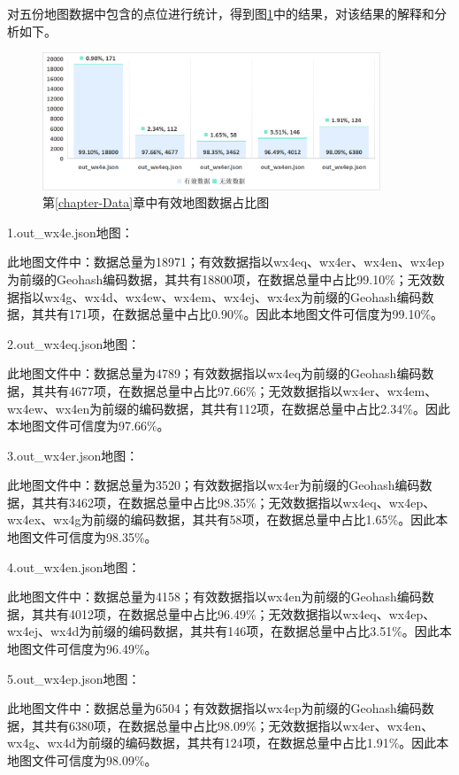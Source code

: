 对五份地图数据中包含的点位进行统计，得到图\ref{mapdataanalysis-pic}中的结果，对该结果的解释和分析如下。

\begin{figure}[ht]
  \centering
  \includegraphics[width=0.9\textwidth]{undergraduate-thesis/images/mapDataAnalysis.png}
  \caption{第\ref{chapter-Data}章中有效地图数据占比图}
  \label{mapdataanalysis-pic} %
\end{figure}

1.out\_wx4e.json地图：

此地图文件中：数据总量为18971；有效数据指以wx4eq、wx4er、wx4en、wx4ep为前缀的Geohash编码数据，其共有18800项，在数据总量中占比99.10\%；无效数据指以wx4g、wx4d、wx4ew、wx4em、wx4ej、wx4ex为前缀的Geohash编码数据，其共有171项，在数据总量中占比0.90\%。因此本地图文件可信度为99.10\%。

2.out\_wx4eq.json地图：

此地图文件中：数据总量为4789；有效数据指以wx4eq为前缀的Geohash编码数据，其共有4677项，在数据总量中占比97.66\%；无效数据指以wx4er、wx4em、wx4ew、wx4en为前缀的编码数据，其共有112项，在数据总量中占比2.34\%。因此本地图文件可信度为97.66\%。

3.out\_wx4er.json地图：

此地图文件中：数据总量为3520；有效数据指以wx4er为前缀的Geohash编码数据，其共有3462项，在数据总量中占比98.35\%；无效数据指以wx4eq、wx4ep、wx4ex、wx4g为前缀的编码数据，其共有58项，在数据总量中占比1.65\%。因此本地图文件可信度为98.35\%。

4.out\_wx4en.json地图：

此地图文件中：数据总量为4158；有效数据指以wx4en为前缀的Geohash编码数据，其共有4012项，在数据总量中占比96.49\%；无效数据指以wx4eq、wx4ep、wx4ej、wx4d为前缀的编码数据，其共有146项，在数据总量中占比3.51\%。因此本地图文件可信度为96.49\%。

5.out\_wx4ep.json地图：

此地图文件中：数据总量为6504；有效数据指以wx4ep为前缀的Geohash编码数据，其共有6380项，在数据总量中占比98.09\%；无效数据指以wx4er、wx4en、wx4g、wx4d为前缀的编码数据，其共有124项，在数据总量中占比1.91\%。因此本地图文件可信度为98.09\%。

